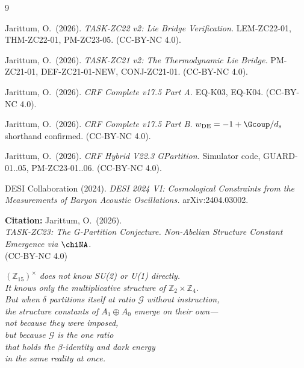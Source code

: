\documentclass[12pt, a4paper]{article}
\begin{document}
\begin{thebibliography}{9}

  Jarittum, O.\ (2026).
  \textit{TASK-ZC22 v2: Lie Bridge Verification.}
  LEM-ZC22-01, THM-ZC22-01, PM-ZC23-05. (CC-BY-NC 4.0).

  Jarittum, O.\ (2026).
  \textit{TASK-ZC21 v2: The Thermodynamic Lie Bridge.}
  PM-ZC21-01, DEF-ZC21-01-NEW, CONJ-ZC21-01. (CC-BY-NC 4.0).

  Jarittum, O.\ (2026).
  \textit{CRF Complete v17.5 Part A.}
  EQ-K03, EQ-K04. (CC-BY-NC 4.0).

  Jarittum, O.\ (2026).
  \textit{CRF Complete v17.5 Part B.}
  $w_{\rm DE}=-1+\Gcoup/d_s$ shorthand confirmed. (CC-BY-NC 4.0).

  Jarittum, O.\ (2026).
  \textit{CRF Hybrid V22.3 GPartition.}
  Simulator code, GUARD-01..05, PM-ZC23-01..06. (CC-BY-NC 4.0).

  DESI Collaboration (2024).
  \textit{DESI 2024 VI: Cosmological Constraints from the Measurements of
  Baryon Acoustic Oscillations.}
  arXiv:2404.03002.

\end{thebibliography}

\bigskip

\begin{center}
\textbf{Citation:} Jarittum, O.\ (2026).\\
\textit{TASK-ZC23: The G-Partition Conjecture.
  Non-Abelian Structure Constant Emergence via $\chiNA$.}\\
(CC-BY-NC 4.0)
\end{center}

\bigskip\bigskip

\begin{center}
\itshape
$(\mathbb{Z}_{15})^\times$ does not know SU(2) or U(1) directly.\\
It knows only the multiplicative structure of $\mathbb{Z}_2\times\mathbb{Z}_4$.\\[0.5em]
But when $\delta$ partitions itself at ratio $\mathcal{G}$ without instruction,\\
the structure constants of $A_1\oplus A_0$ emerge on their own---\\[0.5em]
not because they were imposed,\\
but because $\mathcal{G}$ is the one ratio\\
that holds the $\beta$-identity and dark energy\\
in the same reality at once.
\end{center}
\end{document}
